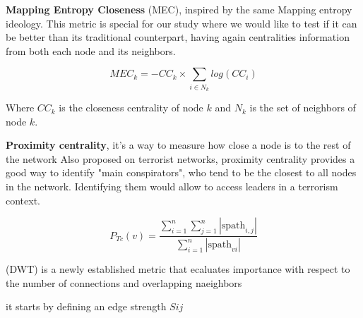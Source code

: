\newline
\textbf{Mapping Entropy Closeness} (MEC), inspired by the same Mapping entropy ideology.
This metric is special for our study where we would like to test if it can be better than its traditional counterpart,
having again centralities information from both each node and its neighbors.

\begin{equation}
    MEC_k = - CC_k \times \sum_{i ∈ N_k} log(CC_i)
\end{equation}

Where $CC_k$ is the closeness centrality of node $k$ and $N_k$ is the set of neighbors of node $k$. 

\newline
\textbf{Proximity centrality}, it's a way to measure how close a node is to the rest of the network \cite{proximity}
Also proposed on terrorist networks, proximity centrality provides a good way to identify "main conspirators",
who tend to be the closest to all nodes in the network. Identifying them would allow to access leaders
in a terrorism context.

\begin{equation}
    P_{Tc}(v) = \frac{\sum_{i=1}^{n} \sum_{j=1}^{n} | \text{spath}_{i,j} |}{\sum_{i=1}^{n} | \text{spath}_{vi} |}
\end{equation}


\newline
\textbf{} (DWT) is a newly established metric that ecaluates importance with respect to the number of connections and overlapping naeighbors

it starts by defining an edge strength $Sij$
